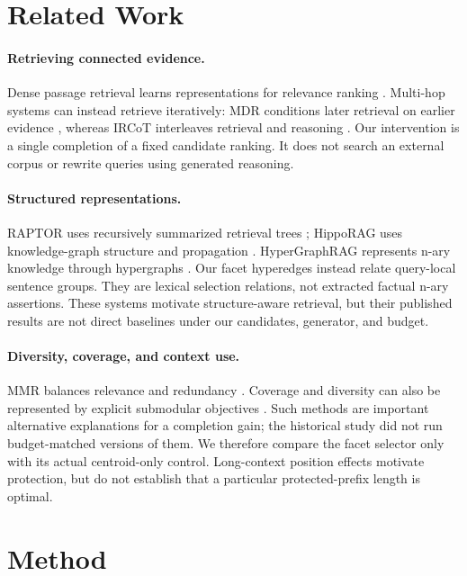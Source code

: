 \documentclass[11pt]{article}
\begin{document}
\section{Related Work}
\paragraph{Retrieving connected evidence.}
Dense passage retrieval learns representations for relevance ranking
\citep{karpukhin2020dpr}. Multi-hop systems can instead retrieve iteratively:
MDR conditions later retrieval on earlier evidence \citep{xiong2021mdr},
whereas IRCoT interleaves retrieval and reasoning
\citep{trivedi2023ircot}. Our intervention is a single completion of a fixed
candidate ranking. It does not search an external corpus or rewrite queries
using generated reasoning.

\paragraph{Structured representations.}
RAPTOR uses recursively summarized retrieval trees
\citep{sarthi2024raptor}; HippoRAG uses knowledge-graph structure and
propagation \citep{gutierrez2024hipporag}. HyperGraphRAG represents n-ary
knowledge through hypergraphs \citep{luo2025hypergraphrag}. Our facet
hyperedges instead relate query-local sentence groups. They are lexical
selection relations, not extracted factual n-ary assertions. These systems
motivate structure-aware retrieval, but their published results are not direct
baselines under our candidates, generator, and budget.

\paragraph{Diversity, coverage, and context use.}
MMR balances relevance and redundancy \citep{carbonell1998mmr}.
Coverage and diversity can also be represented by explicit submodular
objectives \citep{lin2011submodular}. Such methods are important alternative
explanations for a completion gain; the historical study did not run
budget-matched versions of them. We therefore compare the facet selector only
with its actual centroid-only control. Long-context position effects
\citep{liu2024lostmiddle} motivate protection, but do not establish that a
particular protected-prefix length is optimal.

\section{Method}
\end{document}
